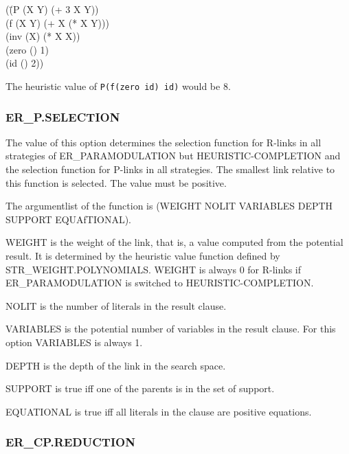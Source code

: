 \PO
{}

\Ex
\begin{tabbing}
(\=(P (X Y) (+ 3 X Y))\\
\> (f (X Y) (+ X (* X Y)))\\ 
\> (inv (X) (* X X))
\\ \> (zero () 1)\\ 
\> (id () 2))
\end{tabbing}

The heuristic value of {\tt P(f(zero id) id)} would be 8.


\subsubsection{ER\_P.SELECTION}
\label{erpselection}
  

The value of this option determines the selection function for R-links
in all strategies of ER\_PA\-RA\-MO\-DU\-LA\-TION but
HEURISTIC-COMPLETION and the selection function for P-links in all
strategies. The smallest link relative to this function is selected. The
value must be positive.

The argumentlist of the function is
(WEIGHT NOLIT VARIABLES DEPTH SUPPORT EQUA\-fTIO\-NAL).

WEIGHT is the weight of the link, that is, a value computed from the
potential result. 
It is determined by the heuristic value function
defined by STR\_WEIGHT.POLYNOMIALS.
WEIGHT is always 0 for R-links if ER\_PARAMODULATION is switched
to HEURISTIC-COMPLETION.

NOLIT is the number of literals in the result clause.

VARIABLES is the potential number of variables in the result clause.
For this option VARIABLES is always 1.

DEPTH is the depth of the link in the search space.

SUPPORT is true iff one of the parents is in the set of support.

EQUATIONAL is true iff all literals in the clause are positive
equations.

\PO  
{}

\subsubsection{ER\_CP.REDUCTION}
  

